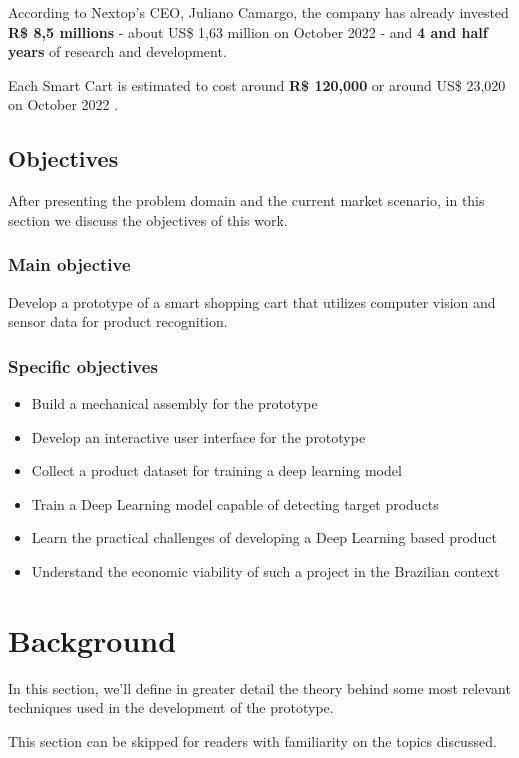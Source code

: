 \documentclass[openright]{normas-utf-tex} %
\begin{document}
According to Nextop's CEO, Juliano Camargo, the company has already invested \textbf{R\$ 8,5 millions} - about US\$ 1,63 million on October 2022 - and \textbf{4 and half years}
of research and development.

Each Smart Cart is estimated to cost around \textbf{R\$ 120,000} or around US\$ 23,020 on October 2022 \cite{Paraiba2022}.

\section{Objectives}

After presenting the problem domain and the current market scenario, in this section we discuss the 
objectives of this work.

\subsection{Main objective}
Develop a prototype of a smart shopping cart that utilizes computer
vision and sensor data for product recognition.

\subsection{Specific objectives}
\begin{itemize}
    \item Build a mechanical assembly for the prototype
    \item Develop an interactive user interface for the prototype
    \item Collect a product dataset for training a deep learning model
    \item Train a Deep Learning model capable of detecting target products
	\item Learn the practical challenges of developing a Deep Learning based product
    \item Understand the economic viability of such a project in the Brazilian context
\end{itemize}

\chapter{Background}

In this section, we'll define in greater detail the theory behind some most
relevant techniques used in the development of the prototype.

This section can be skipped for readers with familiarity on the topics discussed.
\end{document}
